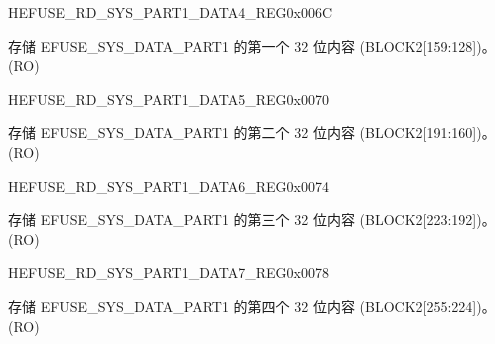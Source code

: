 \begin{register}{H}{EFUSE\_RD\_SYS\_PART1\_DATA4\_REG}{0x006C}\label{regdesc:EFUSERDSYSPART1DATA4REG}
%
\regnewline%
\begin{regdesc}\begin{reglist}
\label{fielddesc:EFUSESYSDATAPART14}\item [EFUSE\_SYS\_DATA\_PART1\_4] 存储 EFUSE\_SYS\_DATA\_PART1 的第一个 32 位内容 (BLOCK2[159:128])。(RO)
\end{reglist}\end{regdesc}
\end{register}


\begin{register}{H}{EFUSE\_RD\_SYS\_PART1\_DATA5\_REG}{0x0070}\label{regdesc:EFUSERDSYSPART1DATA5REG}
%
\regnewline%
\begin{regdesc}\begin{reglist}
\label{fielddesc:EFUSESYSDATAPART15}\item [EFUSE\_SYS\_DATA\_PART1\_5] 存储 EFUSE\_SYS\_DATA\_PART1 的第二个 32 位内容 (BLOCK2[191:160])。(RO)
\end{reglist}\end{regdesc}
\end{register}


\begin{register}{H}{EFUSE\_RD\_SYS\_PART1\_DATA6\_REG}{0x0074}\label{regdesc:EFUSERDSYSPART1DATA6REG}
%
\regnewline%
\begin{regdesc}\begin{reglist}
\label{fielddesc:EFUSESYSDATAPART16}\item [EFUSE\_SYS\_DATA\_PART1\_6] 存储 EFUSE\_SYS\_DATA\_PART1 的第三个 32 位内容 (BLOCK2[223:192])。(RO)
\end{reglist}\end{regdesc}
\end{register}


\begin{register}{H}{EFUSE\_RD\_SYS\_PART1\_DATA7\_REG}{0x0078}\label{regdesc:EFUSERDSYSPART1DATA7REG}
%
\regnewline%
\begin{regdesc}\begin{reglist}
\label{fielddesc:EFUSESYSDATAPART17}\item [EFUSE\_SYS\_DATA\_PART1\_7] 存储 EFUSE\_SYS\_DATA\_PART1 的第四个 32 位内容 (BLOCK2[255:224])。(RO)
\end{reglist}\end{regdesc}
\end{register}


